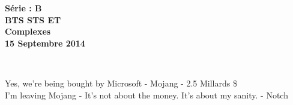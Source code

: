 \documentclass[11pt]{article}
\begin{document}

\begin{minipage}[t]{\textwidth}
  \raggedright
      {\bfseries Série : \textbf{B}}\\
      {\bfseries BTS STS ET}\\[.35ex]
      \vspace*{-1cm}
      \raggedleft
          {\bfseries Complexes}\\[.35ex]
          {\bfseries 15 Septembre 2014}\\[.35ex]
\end{minipage}\\[1em]

\begin{center}
  \textsf{Yes, we’re being bought by Microsoft - Mojang - 2.5 Millards \$}\\
  \textsf{I’m leaving Mojang - It’s not about the money. It’s about my sanity. - Notch}
\end{center}
\end{document}

